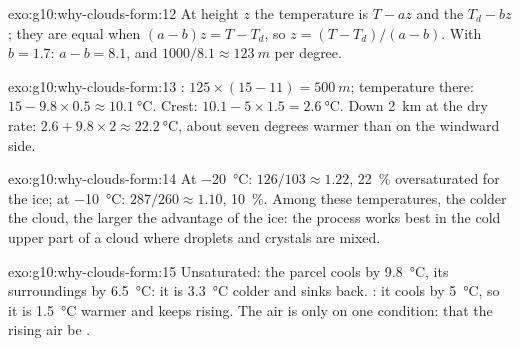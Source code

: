 \begin{solution}{exo:g10:why-clouds-form:12}
At height $z$ the temperature is $T - a z$ and the  $T_d - b z$;
they are equal when $(a - b) z = T - T_d$, so $z = (T - T_d)/(a - b)$. With
$b = 1.7$: $a - b = 8.1$, and $1000/8.1 \approx \qty{123}{m}$ per degree.
\end{solution}

\begin{solution}{exo:g10:why-clouds-form:13}
: $125 \times (15 - 11) = \qty{500}{m}$; temperature there:
$15 - 9.8 \times 0.5 \approx \qty{10.1}{\degreeCelsius}$. Crest: $10.1 - 5
\times 1.5 = \qty{2.6}{\degreeCelsius}$. Down \qty{2}{km} at the dry rate:
$2.6 + 9.8 \times 2 \approx \qty{22.2}{\degreeCelsius}$, about seven degrees
warmer than on the windward side.
\end{solution}

\begin{solution}{exo:g10:why-clouds-form:14}
At \qty{-20}{\degreeCelsius}: $126/103 \approx 1.22$, \qty{22}{\percent}
oversaturated for the ice; at \qty{-10}{\degreeCelsius}: $287/260 \approx
1.10$, \qty{10}{\percent}. Among these temperatures, the colder the cloud,
the larger the advantage of the ice: the process works best in the cold
upper part of a cloud where droplets and crystals are mixed.
\end{solution}

\begin{solution}{exo:g10:why-clouds-form:15}
Unsaturated: the parcel cools by \qty{9.8}{\degreeCelsius}, its surroundings
by \qty{6.5}{\degreeCelsius}: it is \qty{3.3}{\degreeCelsius} colder and
sinks back. : it cools by \qty{5}{\degreeCelsius}, so it is
\qty{1.5}{\degreeCelsius} warmer and keeps rising. The air is  only
on one condition: that the rising air be .
\end{solution}

